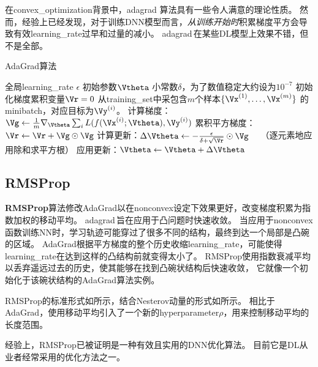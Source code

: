 在\gls{convex_optimization}背景中，\gls{adagrad} 算法具有一些令人满意的理论性质。
然而，经验上已经发现，对于训练\gls{DNN}模型而言，\emph{从训练开始时}积累梯度平方会导致有效\gls{learning_rate}过早和过量的减小。
\gls{adagrad}\,在某些\gls{DL}模型上效果不错，但不是全部。


\begin{algorithm}[ht]
\caption{AdaGrad算法}
\label{alg:ada_grad}
\begin{algorithmic}
\REQUIRE 全局\gls{learning_rate} $\epsilon$
\REQUIRE 初始参数$\Vtheta$
\REQUIRE 小常数$\delta$，为了数值稳定大约设为$10^{-7}$
\STATE 初始化梯度累积变量$\Vr = 0$
    \STATE 从\gls{training_set}中采包含$m$个样本$\{ \Vx^{(1)},\dots, \Vx^{(m)}\}$ 的\gls{minibatch}，对应目标为$\Vy^{(i)}$。
    \STATE 计算梯度： $\Vg \leftarrow  
         \frac{1}{m} \nabla_{\Vtheta} \sum_i L(f(\Vx^{(i)};\Vtheta),\Vy^{(i)})$ 
    \STATE 累积平方梯度：$\Vr \leftarrow \Vr + \Vg \odot \Vg$
    \STATE 计算更新：$\Delta \Vtheta \leftarrow -
    \frac{\epsilon}{\delta+ \sqrt{\Vr}} \odot\Vg$  \ \  （逐元素地应用除和求平方根）
    \STATE 应用更新：$\Vtheta \leftarrow \Vtheta + \Delta \Vtheta$
\ENDWHILE
\end{algorithmic}
\end{algorithm}


\subsection{RMSProp}
\label{sec:rmsprop}
\textbf{RMSProp}算法\citep{Hinton-2012}修改AdaGrad以在\gls{nonconvex}设定下效果更好，改变梯度积累为指数加权的移动平均。
\gls{adagrad}\,旨在应用于凸问题时快速收敛。
当应用于\gls{nonconvex}函数训练\gls{NN}时，学习轨迹可能穿过了很多不同的结构，最终到达一个局部是凸碗的区域。
AdaGrad根据平方梯度的整个历史收缩\gls{learning_rate}，可能使得\gls{learning_rate}在达到这样的凸结构前就变得太小了。
RMSProp使用指数衰减平均以丢弃遥远过去的历史，使其能够在找到凸碗状结构后快速收敛，
它就像一个初始化于该碗状结构的AdaGrad算法实例。


RMSProp的标准形式如所示，结合Nesterov动量的形式如所示。
相比于AdaGrad，使用移动平均引入了一个新的\gls{hyperparameter}$\rho$，用来控制移动平均的长度范围。


经验上，RMSProp已被证明是一种有效且实用的\gls{DNN}优化算法。
目前它是\gls{DL}从业者经常采用的优化方法之一。


